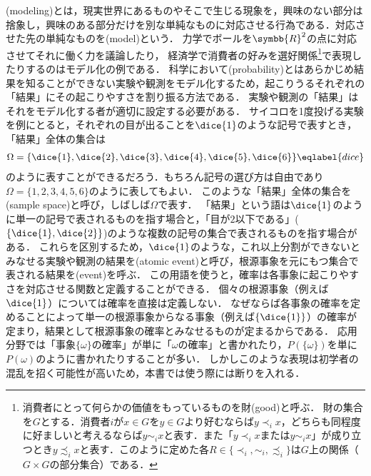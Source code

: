 \documentclass[main.tex]{subfiles}
\begin{document}

(modeling)とは，現実世界にあるものやそこで生じる現象を，興味のない部分は捨象し，興味のある部分だけを別な単純なものに対応させる行為である．対応させた先の単純なものを(model)という．
力学でボールを\(\symbb{R}^2\)の点に対応させてそれに働く力を議論したり，
経済学で消費者の好みを選好関係\footnote{%
消費者にとって何らかの価値をもっているものを財(good)と呼ぶ．
財の集合を\(G\)とする．消費者\(i\)が\(x \in G\)を\(y \in G\)より好むならば\(y \prec_i x\)，どちらも同程度に好ましいと考えるならば\(y \sim_i x\)と表す．また「\(y \prec_i x\)または\(y \sim_i x\)」が成り立つとき\(y \precsim_i x\)と表す．このように定めた各\(R \in \{\prec_i, \sim_i, \precsim_i\}\)は\(G\)上の関係（\(G \times G\)の部分集合）である．
}で表現したりするのはモデル化の例である．
科学において(probability)とはあらかじめ結果を知ることができない実験や観測をモデル化するため，起こりうるそれぞれの「結果」にその起こりやすさを割り振る方法である．
実験や観測の「結果」はそれをモデル化する者が適切に設定する必要がある．
サイコロを1度投げる実験を例にとると，それぞれの目が出ることを\(\dice{1}\)のような記号で表すとき，「結果」全体の集合は
\begin{align}
    \Omega = \{\dice{1}, \dice{2}, \dice{3}, \dice{4}, \dice{5}, \dice{6}\} \eqlabel{dice}
\end{align}
のように表すことができるだろう．もちろん記号の選び方は自由であり\(\Omega = \{1, 2, 3, 4, 5, 6\}\)のように表してもよい．
このような「結果」全体の集合を(sample space)と呼び，しばしば\(\Omega\)で表す．
「結果」という語は\(\dice{1}\)のように単一の記号で表されるものを指す場合と，「目が\(2\)以下である」(\(\{\dice{1}, \dice{2}\}\))のような複数の記号の集合で表されるものを指す場合がある．
これらを区別するため，\(\dice{1}\)のような，これ以上分割ができないとみなせる実験や観測の結果を(atomic event)と呼び，根源事象を元にもつ集合で表される結果を(event)を呼ぶ．
この用語を使うと，確率は各事象に起こりやすさを対応させる関数と定義することができる．
個々の根源事象（例えば\(\dice{1}\)）については確率を直接は定義しない．
なぜならば各事象の確率を定めることによって単一の根源事象からなる事象（例えば\(\{\dice{1}\}\)）の確率が定まり，結果として根源事象の確率とみなせるものが定まるからである．
応用分野では「事象\(\{\omega\}\)の確率」が単に「\(\omega\)の確率」と書かれたり，\(P(\{\omega\})\)を単に\(P(\omega)\)のように書かれたりすることが多い．
しかしこのような表現は初学者の混乱を招く可能性が高いため，本書では使う際には断りを入れる．
\end{document}
